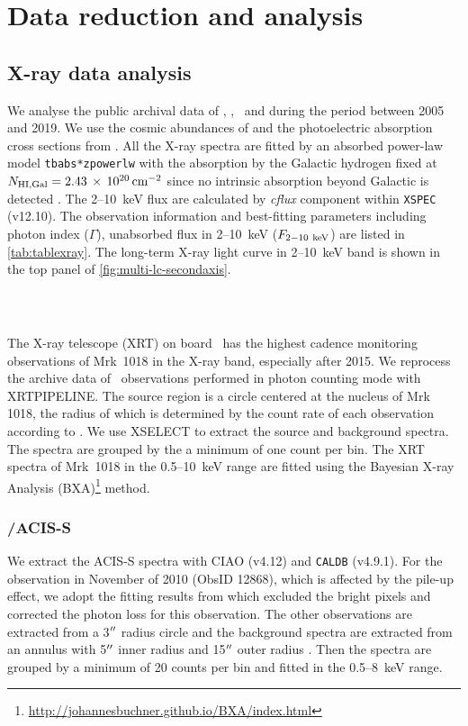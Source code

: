 \section{Data reduction and analysis}\label{sec:data}
\subsection{X-ray data analysis}
We analyse the public archival data of \swift, \xmm, \chandra ~and \nustar during the period between 2005 and 2019. We use the cosmic abundances of \citet{2000ApJ...542..914W} and the photoelectric absorption cross sections from \citet{1995A&AS..109..125V}. All the X-ray spectra are fitted by an absorbed power-law model  \texttt{tbabs*zpowerlw} with the absorption by the Galactic hydrogen fixed at $N_{\rm{HI,Gal}}=2.43 \,\times \,10^{20}\, \rm{cm}^{-2}$ \citep[][]{2005A&A...440..775K} since no intrinsic absorption beyond Galactic is detected \citep[see][]{2016A&A...593L...9H,2017A&A...607L...9K}. The 2--10~keV flux are calculated by {\it cflux} component within {\tt XSPEC} (v12.10). The observation information and best-fitting parameters including photon index ($\Gamma$), unabsorbed flux in 2--10~keV ($F_{\rm{2-10~keV}}$) are listed in \autoref{tab:tablexray}. The long-term X-ray light curve in 2--10~keV band is shown in the top panel of \autoref{fig:multi-lc-secondaxis}.


\subsubsection{\xrt\,}
\label{data-xrt}
The X-ray telescope (XRT) on board \swift\, has the highest cadence monitoring observations of Mrk~1018 in the X-ray band, especially after 2015. We reprocess the archive data of \xrt\, observations performed in photon counting mode with {\scriptsize XRTPIPELINE}. The source region is a circle centered at the nucleus of Mrk 1018, the radius of which is determined by the count rate of each observation according to \citet{2009MNRAS.397.1177E}. We use {\scriptsize XSELECT} to extract the source and background spectra. The spectra are grouped by the a minimum of one count per bin. The XRT spectra of Mrk~1018 in the 0.5--10~keV range are fitted using the Bayesian X-ray Analysis (BXA)\footnote{\url{http://johannesbuchner.github.io/BXA/index.html}} method.  %


\subsubsection{\chandra/ACIS-S}
We extract the ACIS-S spectra with CIAO (v4.12) and {\tt CALDB} (v4.9.1). For the observation in November of 2010 (ObsID 12868), which is affected by the pile-up effect, we adopt the fitting results from \citet{2016A&A...593L...9H} which excluded the bright pixels and corrected the photon loss for this observation. The other observations are extracted from a 3$\hbox{$^{\prime\prime}$}$ radius circle and the background spectra are extracted from an annulus with 5$\hbox{$^{\prime\prime}$}$ inner radius and 15$\hbox{$^{\prime\prime}$}$ outer radius \citep[see also][]{2017ApJ...840...11L}. Then the spectra are grouped by a minimum of 20 counts per bin and fitted in the 0.5--8~keV range. 




